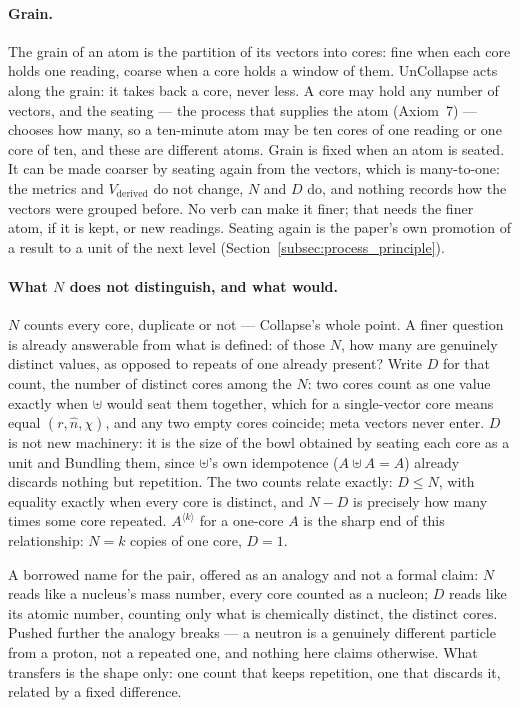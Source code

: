 \documentclass[12pt, a4paper]{article}
\begin{document}
\paragraph{Grain.} The grain of an atom is the partition of its vectors into cores: fine when each core holds one reading, coarse when a core holds a window of them. UnCollapse acts along the grain: it takes back a core, never less. A core may hold any number of vectors, and the seating --- the process that supplies the atom (Axiom~7) --- chooses how many, so a ten-minute atom may be ten cores of one reading or one core of ten, and these are different atoms. Grain is fixed when an atom is seated. It can be made coarser by seating again from the vectors, which is many-to-one: the metrics and $V_{\text{derived}}$ do not change, $N$ and $D$ do, and nothing records how the vectors were grouped before. No verb can make it finer; that needs the finer atom, if it is kept, or new readings. Seating again is the paper's own promotion of a result to a unit of the next level (Section~\ref{subsec:process_principle}).

\paragraph{What $N$ does not distinguish, and what would.} $N$ counts
every core, duplicate or not --- Collapse's whole point. A
finer question is already answerable from what is defined: of those
$N$, how many are genuinely distinct values, as opposed to repeats of
one already present? Write $D$ for that count, the number of
distinct cores among the $N$: two cores count as one value exactly when
$\uplus$ would seat them together, which for a single-vector core means
equal $(r,\hat n,\chi)$, and any two empty cores coincide; meta vectors never enter. $D$ is not
new machinery: it is the size of the bowl obtained by seating each core
as a unit and Bundling them, since $\uplus$'s own idempotence
($A\uplus A=A$) already discards nothing but repetition. The two
counts relate exactly: $D\le N$, with equality exactly when every core
is distinct, and $N-D$ is precisely how many times some core repeated.
$A^{\langle k\rangle}$ for a one-core $A$ is the sharp end of this
relationship: $N=k$ copies of one core, $D=1$.

A borrowed name for the pair, offered as an analogy and not a formal
claim: $N$ reads like a nucleus's mass number, every core counted as a
nucleon; $D$ reads like its atomic number, counting only what is
chemically distinct, the distinct cores. Pushed further the analogy breaks --- a neutron is a
genuinely different particle from a proton, not a repeated one, and
nothing here claims otherwise. What transfers is the shape only: one
count that keeps repetition, one that discards it, related by a
fixed difference.
\end{document}
